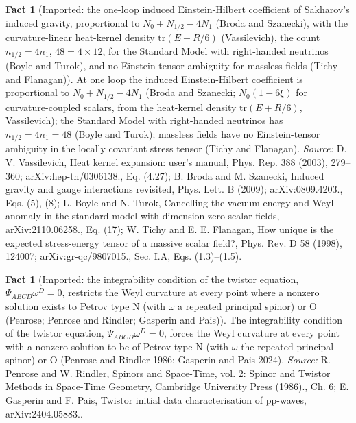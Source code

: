 \documentclass[11pt]{article}
\theoremstyle{definition}
\newtheorem{fact}[theorem]{Fact}
\theoremstyle{plain}
\begin{document}
\begin{fact}[Imported: the one-loop induced Einstein-Hilbert coefficient of Sakharov's induced gravity, proportional to $N_{0} + N_{1/2} - 4N_{1}$ (Broda and Szanecki), with the curvature-linear heat-kernel density $\mathrm{tr}(E + R/6)$ (Vassilevich), the count $n_{1/2} = 4n_{1}$, $48 = 4 \times 12$, for the Standard Model with right-handed neutrinos (Boyle and Turok), and no Einstein-tensor ambiguity for massless fields (Tichy and Flanagan)]\label{c:synthesis.imported-sakharov-induced-gravity-coefficients}
At one loop the induced Einstein-Hilbert coefficient is proportional to $N_{0} + N_{1/2} - 4N_{1}$ (Broda and Szanecki; $N_{0}(1 - 6\xi)$ for curvature-coupled scalars, from the heat-kernel density $\mathrm{tr}(E + R/6)$, Vassilevich); the Standard Model with right-handed neutrinos has $n_{1/2} = 4n_{1} = 48$ (Boyle and Turok); massless fields have no Einstein-tensor ambiguity in the locally covariant stress tensor (Tichy and Flanagan).
\emph{Source:} D. V. Vassilevich, Heat kernel expansion: user's manual, Phys. Rep. 388 (2003), 279--360; arXiv:hep-th/0306138., Eq. (4.27); B. Broda and M. Szanecki, Induced gravity and gauge interactions revisited, Phys. Lett. B (2009); arXiv:0809.4203., Eqs. (5), (8); L. Boyle and N. Turok, Cancelling the vacuum energy and Weyl anomaly in the standard model with dimension-zero scalar fields, arXiv:2110.06258., Eq. (17); W. Tichy and E. E. Flanagan, How unique is the expected stress-energy tensor of a massive scalar field?, Phys. Rev. D 58 (1998), 124007; arXiv:gr-qc/9807015., Sec. I.A, Eqs. (1.3)--(1.5).
\end{fact}

\begin{fact}[Imported: the integrability condition of the twistor equation, $\Psi_{ABCD}\omega^{D} = 0$, restricts the Weyl curvature at every point where a nonzero solution exists to Petrov type N (with $\omega$ a repeated principal spinor) or O (Penrose; Penrose and Rindler; Gasperin and Pais)]\label{c:synthesis.imported-twistor-equation-integrability-petrov-n-or-o}
The integrability condition of the twistor equation, $\Psi_{ABCD}\omega^{D} = 0$, forces the Weyl curvature at every point with a nonzero solution to be of Petrov type N (with $\omega$ the repeated principal spinor) or O (Penrose and Rindler 1986; Gasperin and Pais 2024).
\emph{Source:} R. Penrose and W. Rindler, Spinors and Space-Time, vol. 2: Spinor and Twistor Methods in Space-Time Geometry, Cambridge University Press (1986)., Ch. 6; E. Gasperin and F. Pais, Twistor initial data characterisation of pp-waves, arXiv:2404.05883..
\end{fact}
\end{document}
